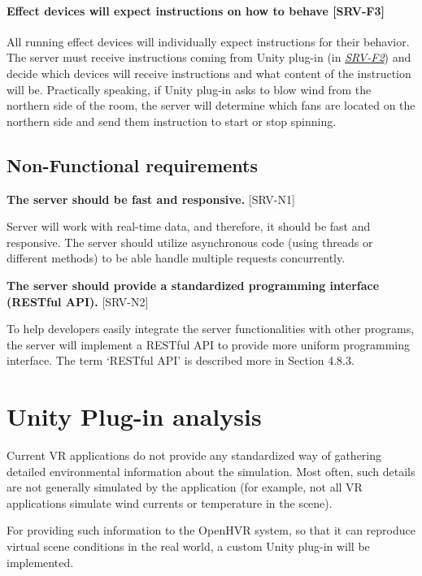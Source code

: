 \hypertarget{x-\textbf{effect-devices-will-expect-instructions-on-how-to-behave}-[srv-f3]}{\paragraph*{\textbf{Effect devices will expect instructions on how to behave} [SRV-F3]}}
All running effect devices will individually expect instructions for their
behavior. The server must receive instructions coming from Unity plug-in (in \hyperlink{srv-f2}{\textit{SRV-F2}})
and decide which devices will receive instructions and what content of the
instruction will be.
Practically speaking, if Unity plug-in asks to blow wind from the northern side of
the room, the server will determine which fans are located on the northern side
and send them instruction to start or stop spinning.

\pagebreak

\subsection{Non-Functional requirements}
\textbf{The server should be fast and responsive.} [SRV-N1]

Server will work with real-time data, and therefore, it should be fast and
responsive. The server should utilize asynchronous code (using threads or 
different methods) to be able handle multiple requests concurrently.

\textbf{The server should provide a standardized programming interface (RESTful API).} [SRV-N2]

To help developers easily integrate the server functionalities with other 
programs, the server will implement a RESTful API to provide more uniform
programming interface. The term `RESTful API' is described more in
Section 4.8.3.


\hypertarget{x-unity-plug-in-analysis}{\section{Unity Plug-in analysis}}
Current VR applications do not provide any standardized way
of gathering detailed environmental information about the simulation.
Most often, such details are not generally simulated by the application
(for example, not all VR applications simulate wind currents or
temperature in the scene).

For providing such information to the OpenHVR system, so that it can
reproduce virtual scene conditions in the real world, a custom Unity plug-in
will be implemented.

